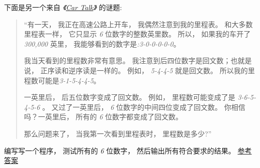 \begin{exercise}

下面是另一个来自 {\em 《\href{http://www.cartalk.com/content/puzzlers}{Car Talk}》} 的谜题:
  
  


\begin{quote}
    ``有一天， 我正在高速公路上开车， 我偶然注意到我的里程表。  和大多数里程表一样， 它只显示 {\em 6} 位数字的整数英里数。
    所以， 如果我的车开了{\em 300,000} 英里， 我能够看到的数字是{\em :3-0-0-0-0-0}。

    我当天看到的里程数非常有意思。  我注意到后四位数字是回文数；也就是说， 正序读和逆序读是一样的。  例如， {\em 5-4-4-5} 就是回文数。
    所以我的里程数可能是{\em 3-1-5-4-4-5}。

    一英里后， 后五位数字变成了回文数。  例如， 里程数可能变成了是 {\em 3-6-5-4-5-6} 。  又过了一英里后， {\em 6} 位数字的中间四位变成了回文数。
    你相信吗？一英里后， 所有的 {\em 6} 位数字都变成了回文数。

    那么问题来了， 当我第一次看到里程表时， 里程数是多少?''
\end{quote}


编写写一个程序， 测试所有的 {\em 6} 位数字， 然后输出所有符合要求的结果。
\href{http://thinkpython2.com/code/cartalk2.py}{参考答案}

\end{exercise}


